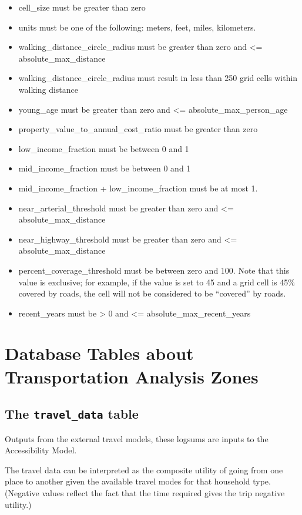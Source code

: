 \begin{itemize} \tight
\item cell_size must be greater than zero
\item units must be one of the following: meters, feet, miles, kilometers.
\item walking_distance_circle_radius must be greater than zero and \textless{}= absolute_max_distance
\item walking_distance_circle_radius must result in less than 250 grid cells within walking distance
\item young_age must be greater than zero and \textless{}= absolute_max_person_age
\item property_value_to_annual_cost_ratio must be greater than zero
\item low_income_fraction must be between 0 and 1
\item mid_income_fraction must be between 0 and 1
\item mid_income_fraction + low_income_fraction must be at most 1.
\item near_arterial_threshold must be greater than zero and \textless{}= absolute_max_distance
\item near_highway_threshold must be greater than zero and \textless{}= absolute_max_distance
\item percent_coverage_threshold must be between zero and 100. Note that this value is exclusive; for example, if the value is set to 45 and a grid cell is 45\% covered by roads, the cell will not be considered to be ``covered'' by roads.
\item recent_years must be \textgreater{} 0 and \textless{}= absolute_max_recent_years

\end{itemize}

\section{Database Tables about Transportation Analysis Zones}

\subsection{The {\tt travel_data} table}

Outputs from the external travel models, \modelsindex these logsums are inputs to the
Accessibility Model. \modelsindex


The travel data can be interpreted as the composite utility of going from one
place to another given the available travel modes for that household type.
(Negative values reflect the fact that the time required gives the trip
negative utility.)



